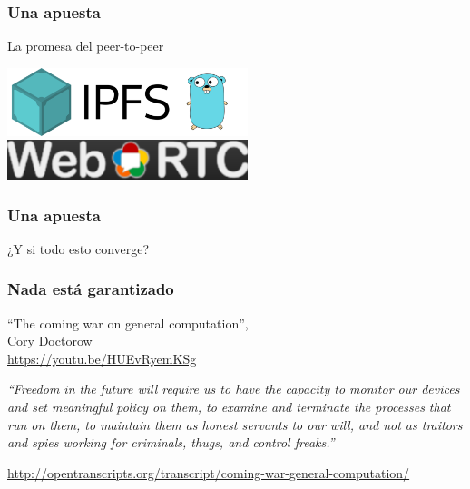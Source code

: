 \documentclass[17pt,aspectratio=169,hyperref=pdfusetitle]{beamer}
\begin{document}
\begin{frame}[fragile]
  \frametitle{Una apuesta}

  La promesa del peer-to-peer

  \begin{center}
  \includegraphics[width=7cm]{figs/ipfs}
  \includegraphics[width=7cm]{figs/webrtc}
  \end{center}
  
\end{frame}

\begin{frame}[fragile]
  \frametitle{Una apuesta}

  \begin{center}
  {\Large
  ¿Y si todo esto converge?
  }
  \end{center}
\end{frame}

\begin{frame}[fragile]
  \frametitle{Nada está garantizado}

  ``The coming war on general computation'', \\
  Cory Doctorow \\

  \url{https://youtu.be/HUEvRyemKSg}
\end{frame}

\begin{frame}[fragile]

  {\em
  ``Freedom in the future will require us to have the capac­i­ty to mon­i­tor our devices and set mean­ing­ful pol­i­cy on them, to exam­ine and ter­mi­nate the process­es that run on them, to main­tain them as hon­est ser­vants to our will, and not as trai­tors and spies work­ing for crim­i­nals, thugs, and con­trol freaks.''
  }

  \begin{flushright}
  {\small
    \url{http://opentranscripts.org/transcript/coming-war-general-computation/}
  }
  \end{flushright}
  
\end{frame}
\end{document}
